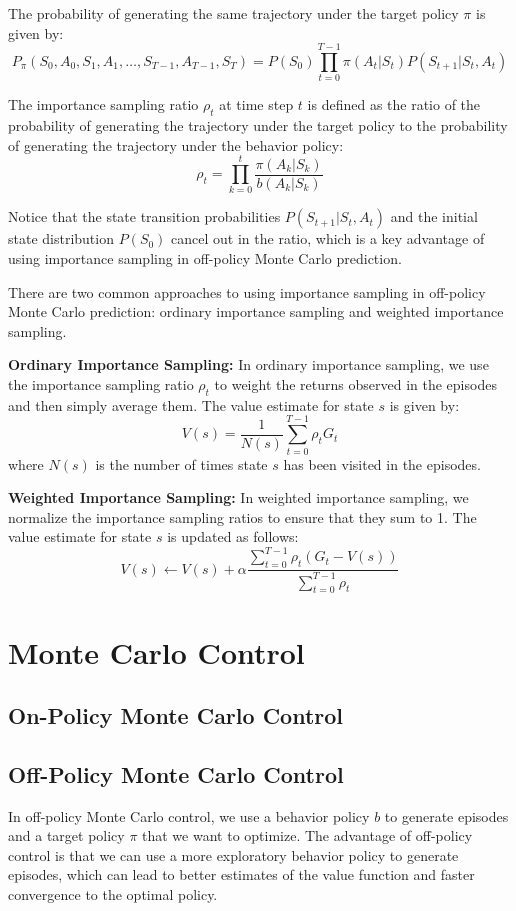 \documentclass{article}
\begin{document}
The probability of generating the same trajectory under the target policy \( \pi \) is given by:
\begin{equation}
P_\pi(S_0, A_0, S_1, A_1, \ldots, S_{T-1}, A_{T-1}, S_T) = P(S_0) \prod_{t=0}^{T-1} \pi(A_t | S_t) P(S_{t+1}| S_t, A_t)
\end{equation}

The importance sampling ratio \( \rho_t \) at time step \( t \) is defined as the ratio of the probability of generating the trajectory under the target policy to the probability of generating the trajectory under the behavior policy:
\begin{equation}
\rho_t = \prod_{k=0}^{t} \frac{\pi(A_k | S_k)}{b(A_k | S_k)}
\end{equation}  

Notice that the state transition probabilities \( P(S_{t+1}| S_t, A_t) \) and the initial state distribution \( P(S_0) \) cancel out in the ratio, which is a key advantage of using importance sampling in off-policy Monte Carlo prediction.

There are two common approaches to using importance sampling in off-policy Monte Carlo prediction: ordinary importance sampling and weighted importance sampling.

\textbf{Ordinary Importance Sampling:} In ordinary importance sampling, we use the importance sampling ratio \( \rho_t \) to weight the returns observed in the episodes and then simply average them.
The value estimate for state \( s \) is given by:
\begin{equation}
V(s) = \frac{1}{N(s)} \sum_{t=0}^{T-1} \rho_t G_t
\end{equation}
where \( N(s) \) is the number of times state \( s \) has been visited in the episodes.

\textbf{Weighted Importance Sampling:} In weighted importance sampling, we normalize the importance sampling ratios to ensure that they sum to 1. The value estimate for state \( s \) is updated as follows:
\begin{equation}
V(s) \leftarrow V(s) + \alpha \frac{\sum_{t=0}^{T-1} \rho_t (G_t - V(s))}{\sum_{t=0}^{T-1} \rho_t}
\end{equation}

\section{Monte Carlo Control}

\subsection{On-Policy Monte Carlo Control}

\subsection{Off-Policy Monte Carlo Control}
\quad In off-policy Monte Carlo control, we use a behavior policy \( b \) to generate episodes and a target policy \( \pi \) that we want to optimize.
The advantage of off-policy control is that we can use a more exploratory behavior policy to generate episodes, which can lead to better estimates of the value function and faster convergence to the optimal policy.
\end{document}
